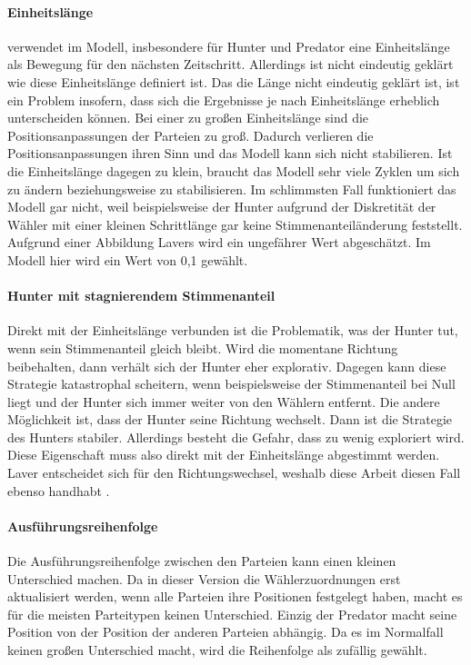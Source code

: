 \paragraph{Einheitslänge}
\citet{laver2005policy} verwendet im Modell, insbesondere für Hunter und Predator eine Einheitslänge als Bewegung für den nächsten Zeitschritt. Allerdings ist nicht eindeutig geklärt wie diese Einheitslänge definiert ist.
Das die Länge nicht eindeutig geklärt ist, ist ein Problem insofern, dass sich die Ergebnisse je nach Einheitslänge erheblich unterscheiden können. Bei einer zu großen Einheitslänge sind die Positionsanpassungen der Parteien zu groß. Dadurch verlieren die Positionsanpassungen ihren Sinn und das Modell kann sich nicht stabilieren. Ist die Einheitslänge dagegen zu klein, braucht das Modell sehr viele Zyklen um sich zu ändern beziehungsweise zu stabilisieren. Im schlimmsten Fall funktioniert das Modell gar nicht, weil beispielsweise der Hunter aufgrund der Diskretität der Wähler mit einer kleinen Schrittlänge gar keine Stimmenanteiländerung feststellt.
Aufgrund einer Abbildung Lavers \citep[Abb.\,4]{laver2005policy} wird ein ungefährer Wert abgeschätzt. Im Modell hier wird ein Wert von 0,1 gewählt.

\paragraph{Hunter mit stagnierendem Stimmenanteil}
Direkt mit der Einheitslänge verbunden ist die Problematik, was der Hunter tut, wenn sein Stimmenanteil gleich bleibt. Wird die momentane Richtung beibehalten, dann verhält sich der Hunter eher explorativ. Dagegen kann diese Strategie katastrophal scheitern, wenn beispielsweise der Stimmenanteil bei Null liegt und der Hunter sich immer weiter von den Wählern entfernt. Die andere Möglichkeit ist, dass der Hunter seine Richtung wechselt. Dann ist die Strategie des Hunters stabiler. Allerdings besteht die Gefahr, dass zu wenig exploriert wird. Diese Eigenschaft muss also direkt mit der Einheitslänge abgestimmt werden.
Laver entscheidet sich für den Richtungswechsel, weshalb diese Arbeit diesen Fall ebenso handhabt \citep[S.\,280]{laver2005policy}.

\paragraph{Ausführungsreihenfolge}
Die Ausführungsreihenfolge zwischen den Parteien kann einen kleinen Unterschied machen. Da in dieser Version die Wählerzuordnungen erst aktualisiert werden, wenn alle Parteien ihre Positionen festgelegt haben, macht es für die meisten Parteitypen keinen Unterschied. Einzig der Predator macht seine Position von der Position der anderen Parteien abhängig. Da es im Normalfall keinen großen Unterschied macht, wird die Reihenfolge als zufällig gewählt.

